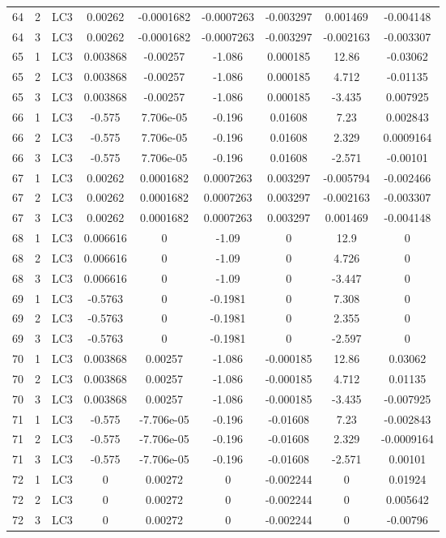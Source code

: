\documentclass{article}%
\begin{document}
\begin{longtable}{| c c c | c c c c c c |}
64&2&LC3&0.00262&{-}0.0001682&{-}0.0007263&{-}0.003297&0.001469&{-}0.004148\\%
64&3&LC3&0.00262&{-}0.0001682&{-}0.0007263&{-}0.003297&{-}0.002163&{-}0.003307\\%
65&1&LC3&0.003868&{-}0.00257&{-}1.086&0.000185&12.86&{-}0.03062\\%
65&2&LC3&0.003868&{-}0.00257&{-}1.086&0.000185&4.712&{-}0.01135\\%
65&3&LC3&0.003868&{-}0.00257&{-}1.086&0.000185&{-}3.435&0.007925\\%
66&1&LC3&{-}0.575&7.706e{-}05&{-}0.196&0.01608&7.23&0.002843\\%
66&2&LC3&{-}0.575&7.706e{-}05&{-}0.196&0.01608&2.329&0.0009164\\%
66&3&LC3&{-}0.575&7.706e{-}05&{-}0.196&0.01608&{-}2.571&{-}0.00101\\%
67&1&LC3&0.00262&0.0001682&0.0007263&0.003297&{-}0.005794&{-}0.002466\\%
67&2&LC3&0.00262&0.0001682&0.0007263&0.003297&{-}0.002163&{-}0.003307\\%
67&3&LC3&0.00262&0.0001682&0.0007263&0.003297&0.001469&{-}0.004148\\%
68&1&LC3&0.006616&0&{-}1.09&0&12.9&0\\%
68&2&LC3&0.006616&0&{-}1.09&0&4.726&0\\%
68&3&LC3&0.006616&0&{-}1.09&0&{-}3.447&0\\%
69&1&LC3&{-}0.5763&0&{-}0.1981&0&7.308&0\\%
69&2&LC3&{-}0.5763&0&{-}0.1981&0&2.355&0\\%
69&3&LC3&{-}0.5763&0&{-}0.1981&0&{-}2.597&0\\%
70&1&LC3&0.003868&0.00257&{-}1.086&{-}0.000185&12.86&0.03062\\%
70&2&LC3&0.003868&0.00257&{-}1.086&{-}0.000185&4.712&0.01135\\%
70&3&LC3&0.003868&0.00257&{-}1.086&{-}0.000185&{-}3.435&{-}0.007925\\%
71&1&LC3&{-}0.575&{-}7.706e{-}05&{-}0.196&{-}0.01608&7.23&{-}0.002843\\%
71&2&LC3&{-}0.575&{-}7.706e{-}05&{-}0.196&{-}0.01608&2.329&{-}0.0009164\\%
71&3&LC3&{-}0.575&{-}7.706e{-}05&{-}0.196&{-}0.01608&{-}2.571&0.00101\\%
72&1&LC3&0&0.00272&0&{-}0.002244&0&0.01924\\%
72&2&LC3&0&0.00272&0&{-}0.002244&0&0.005642\\%
72&3&LC3&0&0.00272&0&{-}0.002244&0&{-}0.00796\\%

\end{longtable}
\end{document}
